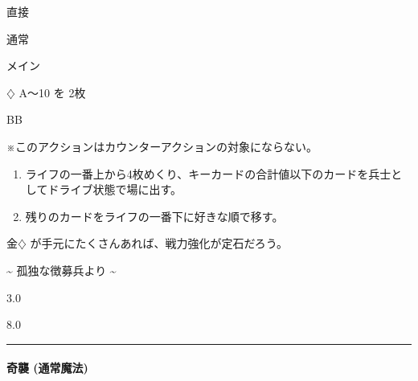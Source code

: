\documentclass[letterpaper,10pt,dvipdfmx]{sphinxmanual}
\begin{document}
\sphinxAtStartPar
{} 直接

\sphinxAtStartPar
{} 通常

\sphinxAtStartPar
{} メイン

\sphinxAtStartPar
{} {\normalsize $\diamondsuit$} A〜10 を 2枚

\sphinxAtStartPar
{} BB

\sphinxAtStartPar
{} ※このアクションはカウンターアクションの対象にならない。

\sphinxAtStartPar
{}
\begin{enumerate}
%
\item {} 
\sphinxAtStartPar
ライフの一番上から4枚めくり、キーカードの合計値以下のカードを兵士としてドライブ状態で場に出す。

\item {} 
\sphinxAtStartPar
残りのカードをライフの一番下に好きな順で移す。

\end{enumerate}

\sphinxAtStartPar
{}

\sphinxAtStartPar
金{\normalsize $\diamondsuit$} が手元にたくさんあれば、戦力強化が定石だろう。

\sphinxAtStartPar
{}

\sphinxAtStartPar
{}

\sphinxAtStartPar
\textasciitilde{} 孤独な徴募兵より \textasciitilde{}

\sphinxAtStartPar
{}  3.0

\sphinxAtStartPar
{}  8.0


\bigskip\hrule\bigskip



\paragraph{奇襲 (通常魔法)}
\label{\detokenize{auto/actionlist:act-surprise}}\label{\detokenize{auto/actionlist:id41}}
\sphinxAtStartPar
{}
\end{document}
